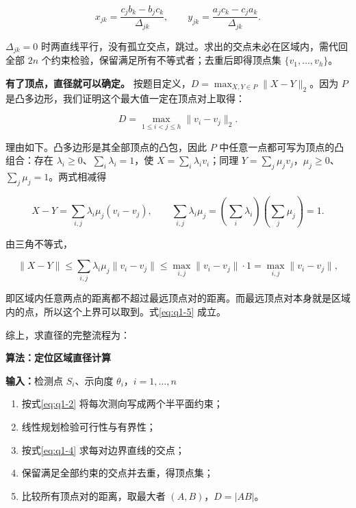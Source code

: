 \documentclass[UTF8,a4paper,zihao=5,fontset=fandol]{ctexart}
\newcounter{algorithm}
\renewcommand{\thealgorithm}{\arabic{algorithm}}
\begin{document}
\begin{equation}\label{eq:q1-4}
x_{jk}=\frac{c_jb_k-b_jc_k}{\Delta_{jk}},\qquad
y_{jk}=\frac{a_jc_k-c_ja_k}{\Delta_{jk}}.
\end{equation}

$\Delta_{jk}=0$ 时两直线平行，没有孤立交点，跳过。求出的交点未必在区域内，需代回全部 $2n$ 个约束检验，保留满足所有不等式者；去重后即得顶点集 $\{v_1,\dots,v_h\}$。

\textbf{有了顶点，直径就可以确定。} 按题目定义，$D=\max_{X,Y\in P}\|X-Y\|_2$。因为 $P$ 是凸多边形，我们证明这个最大值一定在顶点对上取得：

\begin{equation}\label{eq:q1-5}
D=\max_{1\le i<j\le h}\|v_i-v_j\|_2 .
\end{equation}

理由如下。凸多边形是其全部顶点的凸包，因此 $P$ 中任意一点都可写为顶点的凸组合：存在 $\lambda_i\ge0$、$\sum_i\lambda_i=1$，使 $X=\sum_i\lambda_iv_i$；同理 $Y=\sum_j\mu_jv_j$，$\mu_j\ge0$、$\sum_j\mu_j=1$。两式相减得

\[
X-Y=\sum_{i,j}\lambda_i\mu_j(v_i-v_j),
\qquad
\sum_{i,j}\lambda_i\mu_j=\left(\sum_i\lambda_i\right)\left(\sum_j\mu_j\right)=1 .
\]

由三角不等式，

\[
\|X-Y\|\le\sum_{i,j}\lambda_i\mu_j\|v_i-v_j\|\le\max_{i,j}\|v_i-v_j\|\cdot1=\max_{i,j}\|v_i-v_j\|,
\]

即区域内任意两点的距离都不超过最远顶点对的距离。而最远顶点对本身就是区域内的点，所以这个上界可以取到。式\eqref{eq:q1-5} 成立。

综上，求直径的完整流程为：

\par\medskip
\noindent\begin{minipage}{\linewidth}
\small
{}\label{alg:q1-diameter}
\textbf{算法\thealgorithm：定位区域直径计算}\par\smallskip
\noindent\textbf{输入：}检测点 $S_i$、示向度 $\theta_i$，$i=1,\dots,n$
\begin{enumerate}
\setlength{\itemsep}{2pt}
\setlength{\parskip}{0pt}
\item 按式\eqref{eq:q1-2} 将每次测向写成两个半平面约束；
\item 线性规划检验可行性与有界性；
\item 按式\eqref{eq:q1-4} 求每对边界直线的交点；
\item 保留满足全部约束的交点并去重，得顶点集；
\item 比较所有顶点对的距离，取最大者 $(A,B)$，$D=|AB|$。
\end{enumerate}
\end{minipage}
\par\medskip
\end{document}

